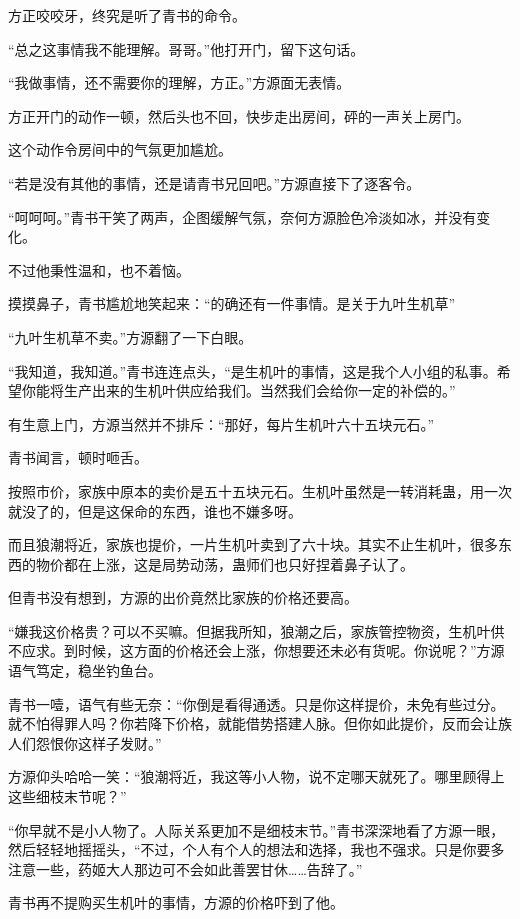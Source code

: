 \begin{this_body}
方正咬咬牙，终究是听了青书的命令。

“总之这事情我不能理解。哥哥。”他打开门，留下这句话。

“我做事情，还不需要你的理解，方正。”方源面无表情。

方正开门的动作一顿，然后头也不回，快步走出房间，砰的一声关上房门。

这个动作令房间中的气氛更加尴尬。

“若是没有其他的事情，还是请青书兄回吧。”方源直接下了逐客令。

“呵呵呵。”青书干笑了两声，企图缓解气氛，奈何方源脸色冷淡如冰，并没有变化。

不过他秉性温和，也不着恼。

摸摸鼻子，青书尴尬地笑起来：“的确还有一件事情。是关于九叶生机草”

“九叶生机草不卖。”方源翻了一下白眼。

“我知道，我知道。”青书连连点头，“是生机叶的事情，这是我个人小组的私事。希望你能将生产出来的生机叶供应给我们。当然我们会给你一定的补偿的。”

有生意上门，方源当然并不排斥：“那好，每片生机叶六十五块元石。”

青书闻言，顿时咂舌。

按照市价，家族中原本的卖价是五十五块元石。生机叶虽然是一转消耗蛊，用一次就没了的，但是这保命的东西，谁也不嫌多呀。

而且狼潮将近，家族也提价，一片生机叶卖到了六十块。其实不止生机叶，很多东西的物价都在上涨，这是局势动荡，蛊师们也只好捏着鼻子认了。

但青书没有想到，方源的出价竟然比家族的价格还要高。

“嫌我这价格贵？可以不买嘛。但据我所知，狼潮之后，家族管控物资，生机叶供不应求。到时候，这方面的价格还会上涨，你想要还未必有货呢。你说呢？”方源语气笃定，稳坐钓鱼台。

青书一噎，语气有些无奈：“你倒是看得通透。只是你这样提价，未免有些过分。就不怕得罪人吗？你若降下价格，就能借势搭建人脉。但你如此提价，反而会让族人们怨恨你这样子发财。”

方源仰头哈哈一笑：“狼潮将近，我这等小人物，说不定哪天就死了。哪里顾得上这些细枝末节呢？”

“你早就不是小人物了。人际关系更加不是细枝末节。”青书深深地看了方源一眼，然后轻轻地摇摇头，“不过，个人有个人的想法和选择，我也不强求。只是你要多注意一些，药姬大人那边可不会如此善罢甘休……告辞了。”

青书再不提购买生机叶的事情，方源的价格吓到了他。


\end{this_body}
